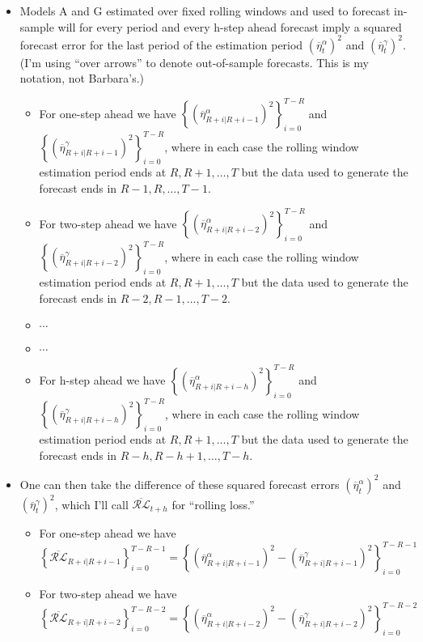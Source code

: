 \documentclass[11pt]{article}
\begin{document}
\begin{itemize}
\item Models A and G estimated over fixed rolling windows and used to forecast in-sample will for every period and every h-step ahead forecast imply a squared forecast error for the last period of the estimation period $\left(\overline{\eta}^{\alpha}_{t}\right)^{2}$ and
 $\left(\overline{\eta}^{\gamma}_{t}\right)^{2}$.  (I'm using ``over arrows'' to denote out-of-sample forecasts.  This is my notation, not Barbara's.)
\begin{itemize}
\item For one-step ahead we have $\left\{\left(\overline{\eta}^{\alpha}_{R+i|R+i-1}\right)^{2}\right\}_{i=0}^{T-R}$ and $\left\{\left(\overline{\eta}^{\gamma}_{R+i|R+i-1}\right)^{2}\right\}_{i=0}^{T-R}$, where in each case the rolling window estimation period
ends at $R, R+1, \dots, T$ but the data used to generate the forecast ends in $R-1, R, \dots, T-1$.
\item For two-step ahead we have $\left\{\left(\overline{\eta}^{\alpha}_{R+i|R+i-2}\right)^{2}\right\}_{i=0}^{T-R}$ and $\left\{\left(\overline{\eta}^{\gamma}_{R+i|R+i-2}\right)^{2}\right\}_{i=0}^{T-R}$, where in each case the rolling window estimation period
ends at $R, R+1, \dots, T$ but the data used to generate the forecast ends in $R-2, R-1, \dots, T-2$.
\item $\cdots$
\item $\cdots$
\item For h-step ahead we have $\left\{\left(\overline{\eta}^{\alpha}_{R+i|R+i-h}\right)^{2}\right\}_{i=0}^{T-R}$ and $\left\{\left(\overline{\eta}^{\gamma}_{R+i|R+i-h}\right)^{2}\right\}_{i=0}^{T-R}$, where in each case the rolling window estimation period
ends at $R, R+1, \dots, T$ but the data used to generate the forecast ends in $R-h, R-h+1, \dots, T-h$.
\end{itemize}
\item One can then take the difference of these squared forecast errors $\left(\overline{\eta}^{\alpha}_{t}\right)^{2}$ and
 $\left(\overline{\eta}^{\gamma}_{t}\right)^{2}$, which I'll call $\overline{\mathcal{RL}}_{t+h}$ for ``rolling loss.''
\begin{itemize}
\item For one-step ahead we have $\left\{\overline{\mathcal{RL}}_{R+i|R+i-1}\right\}_{i=0}^{T-R-1}\!\!\!\!=\left\{\left(\overline{\eta}^{\alpha}_{R+i|R+i-1}\right)^{2}\!\!-\left(\overline{\eta}^{\gamma}_{R+i|R+i-1}\right)^{2}\right\}_{i=0}^{T-R-1}$
\item For two-step ahead we have $\left\{\overline{\mathcal{RL}}_{R+i|R+i-2}\right\}_{i=0}^{T-R-2}\!\!\!\!=\left\{\left(\overline{\eta}^{\alpha}_{R+i|R+i-2}\right)^{2}\!\!-\left(\overline{\eta}^{\gamma}_{R+i|R+i-2}\right)^{2}\right\}_{i=0}^{T-R-2}$

\end{itemize}
\end{itemize}
\end{document}
